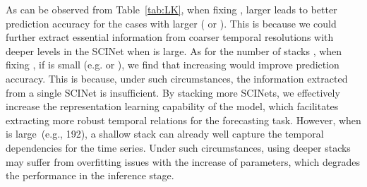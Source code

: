 \documentclass{article}
\begin{document}
As can be observed from Table~\ref{tab:LK}, when fixing ,
larger  leads to better prediction accuracy for the cases with larger  ( or ).
This is because we could further extract essential information from coarser temporal resolutions with deeper levels in the SCINet when  is large. 
As for the number of stacks , when fixing , if  is small (e.g.  or ), we find that increasing  would improve prediction accuracy. This is because, under such circumstances, the information extracted from a single SCINet is insufficient. By stacking more SCINets, we effectively increase the representation learning capability of the model, which facilitates extracting more robust temporal relations for the forecasting task. 
However, 
when  is large~(e.g., 192), a shallow stack can already well capture the temporal dependencies for the time series. Under such circumstances, using deeper stacks may suffer from overfitting issues with the increase of parameters, which degrades the performance in the inference stage.
\end{document}

